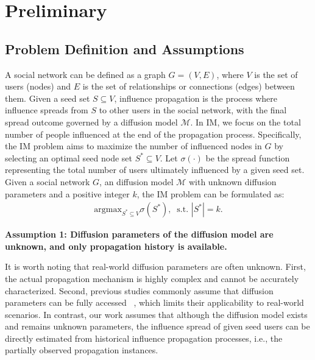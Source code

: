 

\section{Preliminary}
\subsection{Problem Definition and Assumptions}
\label{sec:assume}
A social network can be defined as a graph $G=(V, E)$, where $V$ is the set of users (nodes) and $E$ is the set of relationships or connections (edges) between them.
Given a seed set $S \subseteq V$, influence propagation is the process where influence spreads from 
$S$ to other users in the social network, with the final spread outcome governed by a diffusion model $\mathcal{M}$.
In IM, we focus on the total number of people influenced at the end of the propagation process.
Specifically, the IM problem aims to maximize the number of influenced nodes in $G$ by selecting an optimal seed node set $S^{*} \subseteq V$. 
Let $\sigma(\cdot)$ be the spread function representing the total number of users ultimately influenced by a given seed set. Given a social network $G$, an diffusion model $\mathcal{M}$ with unknown diffusion parameters and a positive integer $k$, the IM problem can be formulated as:
\begin{equation}
\begin{aligned}
    \text{argmax}_{S^{*} \subseteq V} \sigma(S^{*}), \: \text{ s.t. } |S^{*}| = k.
    \label{eq:im_def}
\end{aligned}
\end{equation}

\textbf{
Assumption 1: Diffusion parameters of the diffusion model are unknown, and only propagation history is available.
} 

It is worth noting that real-world diffusion parameters are often unknown.
First, the actual propagation mechanism is highly complex and cannot be accurately characterized. 
Second, previous studies commonly assume that diffusion parameters can be fully accessed ~\cite{tang2015IMM, guo2020-RIS, li2022piano, chen2023ToupleGDD}, which limits their applicability to real-world scenarios.
In contrast, our work assumes that although the diffusion model exists and remains unknown parameters, the influence spread of given seed users can be directly estimated from historical influence propagation processes, i.e., the partially observed propagation instances.


